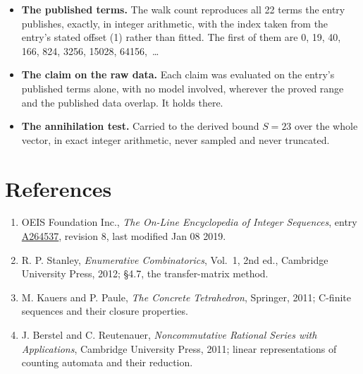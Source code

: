 \documentclass[11pt]{article}
\theoremstyle{definition}
\begin{document}
\begin{itemize}

\item {\bfseries The published terms.} The walk count reproduces all 22 terms the entry publishes, exactly, in integer arithmetic, with the index taken from the entry's stated offset (1) rather than fitted. The first of them are 0, 19, 40, 166, 824, 3256, 15028, 64156,~\dots

\item {\bfseries The claim on the raw data.} Each claim was evaluated on the entry's published terms alone, with no model involved, wherever the proved range and the published data overlap. It holds there.

\item {\bfseries The annihilation test.} Carried to the derived bound $S = 23$ over the whole vector, in exact integer arithmetic, never sampled and never truncated.

\end{itemize}

\section{References}

\begin{enumerate}

\item OEIS Foundation Inc., \emph{The On-Line Encyclopedia of Integer Sequences}, entry \href{https://oeis.org/A264537}{A264537}, revision 8, last modified Jan 08 2019.

\item R. P. Stanley, \emph{Enumerative Combinatorics}, Vol.~1, 2nd ed., Cambridge University Press, 2012; \S4.7, the transfer-matrix method.

\item M. Kauers and P. Paule, \emph{The Concrete Tetrahedron}, Springer, 2011; C-finite sequences and their closure properties.

\item J. Berstel and C. Reutenauer, \emph{Noncommutative Rational Series with Applications}, Cambridge University Press, 2011; linear representations of counting automata and their reduction.

\end{enumerate}
\end{document}
